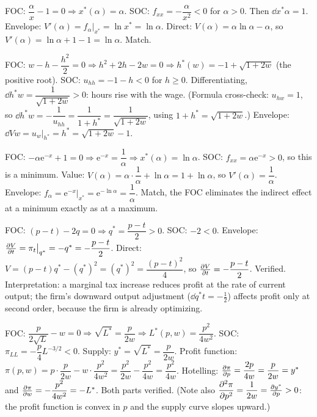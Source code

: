 \begin{solutions}
  \item FOC: $\dfrac{\alpha}{x}-1=0\Rightarrow x^*(\alpha)=\alpha$.
        SOC: $f_{xx}=-\dfrac{\alpha}{x^2}<0$ for $\alpha>0$. Then
        $\dd{x^*}{\alpha}=1$. Envelope:
        $V'(\alpha)=f_\alpha\big|_{x^*}=\ln x^*=\ln\alpha$. Direct:
        $V(\alpha)=\alpha\ln\alpha-\alpha$, so
        $V'(\alpha)=\ln\alpha+1-1=\ln\alpha$. Match.

  \item FOC: $w-h-\dfrac{h^2}{2}=0\Rightarrow h^2+2h-2w=0\Rightarrow
        h^*(w)=-1+\sqrt{1+2w}$ (the positive root). SOC:
        $u_{hh}=-1-h<0$ for $h\ge0$. Differentiating,
        $\dd{h^*}{w}=\dfrac{1}{\sqrt{1+2w}}>0$: hours rise with the
        wage. (Formula cross-check: $u_{hw}=1$, so
        $\dd{h^*}{w}=-\dfrac{1}{u_{hh}}=\dfrac{1}{1+h^*}
        =\dfrac{1}{\sqrt{1+2w}}$, using $1+h^*=\sqrt{1+2w}$.)
        Envelope: $\dd{V}{w}=u_w\big|_{h^*}=h^*=\sqrt{1+2w}-1$.

  \item FOC: $-\alpha\mathrm{e}^{-x}+1=0\Rightarrow
        \mathrm{e}^{-x}=\dfrac1\alpha\Rightarrow x^*(\alpha)=\ln\alpha$.
        SOC: $f_{xx}=\alpha\mathrm{e}^{-x}>0$, so this is a minimum.
        Value:
        $V(\alpha)=\alpha\cdot\dfrac1\alpha+\ln\alpha=1+\ln\alpha$, so
        $V'(\alpha)=\dfrac1\alpha$. Envelope:
        $f_\alpha=\mathrm{e}^{-x}\big|_{x^*}
        =\mathrm{e}^{-\ln\alpha}=\dfrac1\alpha$. Match, the FOC eliminates
        the indirect effect at a minimum exactly as at a maximum.

  \item FOC: $(p-t)-2q=0\Rightarrow q^*=\dfrac{p-t}{2}>0$. SOC:
        $-2<0$. Envelope:
        $\frac{\partial V}{\partial t}=\pi_t\big|_{q^*}=-q^*=-\dfrac{p-t}{2}$. Direct:
        $V=(p-t)q^*-(q^*)^2=(q^*)^2=\dfrac{(p-t)^2}{4}$, so
        $\frac{\partial V}{\partial t}=-\dfrac{p-t}{2}$. Verified. Interpretation: a
        marginal tax increase reduces profit at the rate of current
        output; the firm's downward output adjustment
        ($\dd{q^*}{t}=-\tfrac12$) affects profit only at second order,
        because the firm is already optimizing.

  \item FOC: $\dfrac{p}{2\sqrt L}-w=0\Rightarrow
        \sqrt{L^*}=\dfrac{p}{2w}\Rightarrow
        L^*(p,w)=\dfrac{p^2}{4w^2}$. SOC:
        $\pi_{LL}=-\dfrac p4L^{-3/2}<0$. Supply:
        $y^*=\sqrt{L^*}=\dfrac{p}{2w}$. Profit function:
        $\pi(p,w)=p\cdot\dfrac{p}{2w}-w\cdot\dfrac{p^2}{4w^2}
        =\dfrac{p^2}{2w}-\dfrac{p^2}{4w}=\dfrac{p^2}{4w}$. Hotelling:
        $\frac{\partial \pi}{\partial p}=\dfrac{2p}{4w}=\dfrac{p}{2w}=y^*$ and
        $\frac{\partial \pi}{\partial w}=-\dfrac{p^2}{4w^2}=-L^*$. Both parts verified.
        (Note also
        $\dfrac{\partial^{2}\pi}{\partial p^{2}}=\dfrac{1}{2w}
        =\frac{\partial y^*}{\partial p}>0$: the profit function is convex in $p$ and the
        supply curve slopes upward.)


\end{solutions}
